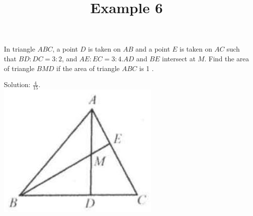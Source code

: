 \documentclass{article}
\title{Example 6}
\date{}
\begin{document}
\maketitle

In triangle \(A B C\), a point \(D\) is taken on \(A B\) and a point \(E\) is taken on \(A C\) such that \(B D: D C=3: 2\), and \(A E: E C=3: 4 . A D\) and \(B E\) intersect at \(M\). Find the area of triangle \(B M D\) if the area of triangle \(A B C\) is 1 .

Solution: \(\frac{4}{15}\).\\
\centering
\includegraphics[width=\textwidth]{images/problem_image_1.jpg}
\end{document}
